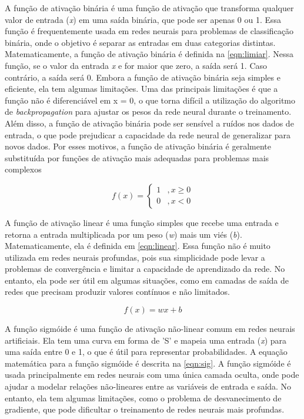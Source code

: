 A função de ativação binária é uma função de ativação que transforma qualquer valor de entrada (\textit{x}) em uma saída binária, que pode ser apenas 0 ou 1. 
Essa função é frequentemente usada em redes neurais para problemas de classificação binária, onde o objetivo é separar as entradas em duas categorias distintas. Matematicamente, a função de ativação binária é definida na \autoref{eqn:limiar}.
Nessa função, se o valor da entrada \textit{x} e for maior que zero, a saída será 1. 
Caso contrário, a saída será 0.
Embora a função de ativação binária seja simples e eficiente, ela tem algumas limitações. 
Uma das principais limitações é que a função não é diferenciável em x = 0, o que torna difícil a utilização do algoritmo de \textit{backpropagation} para ajustar os pesos da rede neural durante o treinamento. 
Além disso, a função de ativação binária pode ser sensível a ruídos nos dados de entrada, o que pode prejudicar a capacidade da rede neural de generalizar para novos dados.
Por esses motivos, a função de ativação binária é geralmente substituída por funções de ativação mais adequadas para problemas mais complexos

\begin{equation}
\label{eqn:limiar}
    f(x) = \left\{\begin{matrix}
    1 & , x\geq 0\\ 
    0 & , x< 0
    \end{matrix}\right.
\end{equation}


A função de ativação linear é uma função simples que recebe uma entrada e retorna a entrada multiplicada por um peso (\textit{w}) mais um viés (\textit{b}). Matematicamente, ela é definida em \autoref{eqn:linear}. 
Essa função não é muito utilizada em redes neurais profundas, pois sua simplicidade pode levar a problemas de convergência e limitar a capacidade de aprendizado da rede. 
No entanto, ela pode ser útil em algumas situações, como em camadas de saída de redes que precisam produzir valores contínuos e não limitados.

\begin{equation}
\label{eqn:linear}
    f(x) = wx + b
\end{equation}

A função sigmóide é uma função de ativação não-linear comum em redes neurais artificiais. 
Ela tem uma curva em forma de 'S' e mapeia uma entrada (\textit{x}) para uma saída entre 0 e 1, o que é útil para representar probabilidades. 
A equação matemática para a função sigmóide é descrita na \autoref{eqn:sig}.
A função sigmóide é usada principalmente em redes neurais com uma única camada oculta, onde pode ajudar a modelar relações não-lineares entre as variáveis de entrada e saída. 
No entanto, ela tem algumas limitações, como o problema de desvanecimento de gradiente, que pode dificultar o treinamento de redes neurais mais profundas.

